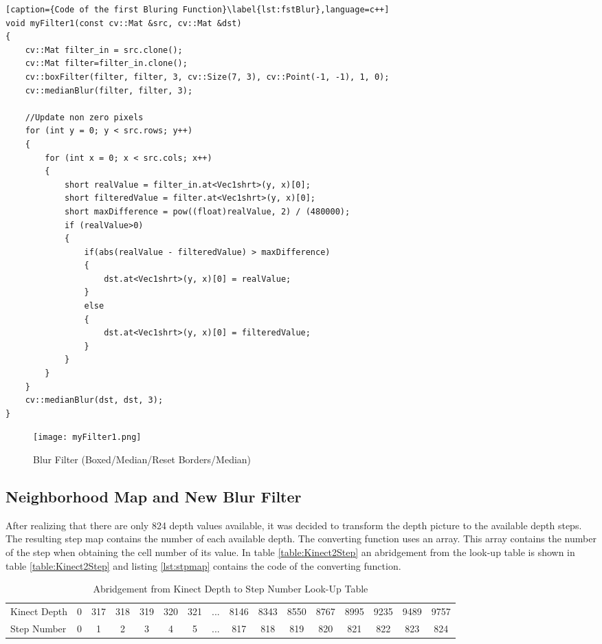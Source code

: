 \begin{lstlisting}[caption={Code of the first Bluring Function}\label{lst:fstBlur},language=c++]
void myFilter1(const cv::Mat &src, cv::Mat &dst)
{
	cv::Mat filter_in = src.clone();
	cv::Mat filter=filter_in.clone();
	cv::boxFilter(filter, filter, 3, cv::Size(7, 3), cv::Point(-1, -1), 1, 0);
	cv::medianBlur(filter, filter, 3);
	
	//Update non zero pixels
	for (int y = 0; y < src.rows; y++)
	{
		for (int x = 0; x < src.cols; x++)
		{
			short realValue = filter_in.at<Vec1shrt>(y, x)[0];
			short filteredValue = filter.at<Vec1shrt>(y, x)[0];
			short maxDifference = pow((float)realValue, 2) / (480000);
			if (realValue>0)
			{
				if(abs(realValue - filteredValue) > maxDifference)
				{
					dst.at<Vec1shrt>(y, x)[0] = realValue;
				}
				else
				{
					dst.at<Vec1shrt>(y, x)[0] = filteredValue;
				}
			}
		}
	}
	cv::medianBlur(dst, dst, 3);
}
\end{lstlisting}

\begin{figure}[H]
\begin{center}
  \texttt{[image: myFilter1.png]}
  \caption{Blur Filter (Boxed/Median/Reset Borders/Median)}
  \label{figure:blur}
\end{center}
\end{figure}

\subsection{Neighborhood Map and New Blur Filter} \label{sect:blurFilter} 
After realizing that there are only 824 depth values available, it was decided to transform the depth picture
to the available depth steps. The resulting step map contains the number of each available depth. 
The converting function uses an array. This array contains the number of the
step when obtaining the cell number of its value. In table \vref{table:Kinect2Step} an 
abridgement from the look-up table is shown in table \vref{table:Kinect2Step}  and 
listing \vref{lst:stpmap} contains the code of the converting function.


\begin{table}[H]
\centering
\tiny
\begin{tabular}{lccccccccccccccc}
Kinect Depth& 0 & 317 & 318 & 319 & 320 & 321 & ... & 8146 & 8343 & 8550 & 8767 & 8995 & 9235 & 9489 & 9757\\
Step Number & 0 &   1 &   2 &   3 &   4 &   5 & ... &   817 & 818 &  819 &  820 &  821 &  822 & 823  & 824\\
\end{tabular}
\caption{Abridgement from Kinect Depth to Step Number Look-Up Table }
\label{table:Kinect2Step}
\end{table}


